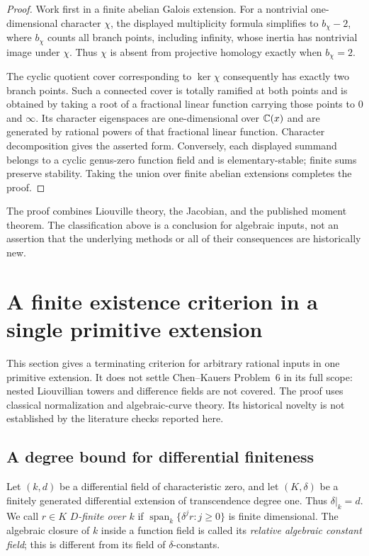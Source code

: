 \begin{proof}
Work first in a finite abelian Galois extension.  For a nontrivial
one-dimensional character $\chi$, the displayed multiplicity formula
simplifies to $b_\chi-2$, where $b_\chi$ counts all branch points,
including infinity, whose inertia has nontrivial image under $\chi$.
Thus $\chi$ is absent from projective homology exactly when
$b_\chi=2$.

The cyclic quotient cover corresponding to $\ker\chi$ consequently
has exactly two branch points.  Such a connected cover is totally
ramified at both points and is obtained by taking a root of a
fractional linear function carrying those points to $0$ and $\infty$.
Its character eigenspaces are one-dimensional over $\mathbb C(x)$ and are
generated by rational powers of that fractional linear function.
Character decomposition gives the asserted form.  Conversely, each
displayed summand belongs to a cyclic genus-zero function field and
is elementary-stable; finite sums preserve stability.  Taking the
union over finite abelian extensions completes the proof.
\end{proof}

The proof combines Liouville theory, the Jacobian, and the published
moment theorem.  The classification above is a conclusion for
algebraic inputs, not an assertion that the underlying methods or all
of their consequences are historically new.

\section{A finite existence criterion in a single primitive extension}
\label{int:section}

This section gives a terminating criterion for arbitrary rational inputs in
one primitive extension.  It does not settle Chen--Kauers Problem~6 in its
full scope: nested Liouvillian towers and difference fields are not covered.
The proof uses classical normalization and algebraic-curve theory.  Its
historical novelty is not established by the literature checks reported here.

\subsection{A degree bound for differential finiteness}

Let $(k,d)$ be a differential field of characteristic zero, and let
$(K,\delta)$ be a finitely generated differential extension of transcendence
degree one.  Thus $\delta|_k=d$.  We call $r\in K$ \emph{$D$-finite over $k$}
if $\operatorname{span}_k\{\delta^j r:j\geq0\}$ is finite dimensional.
The algebraic closure of $k$ inside a function field is called its
\emph{relative algebraic constant field}; this is different from its field
of $\delta$-constants.

